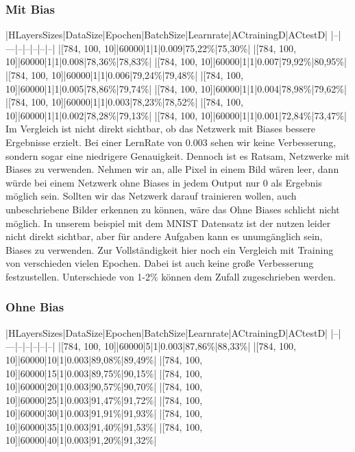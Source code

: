 \documentclass[12pt]{article}
\begin{document}
\subsubsection{ Mit Bias}|HLayersSizes|DataSize|Epochen|BatchSize|Learnrate|ACtrainingD|ACtestD|
|--|---|--|--|--|--|--|
|[784, 100, 10]|60000|1|1|0.009|75,22\%|75,30\%|
|[784, 100, 10]|60000|1|1|0.008|78,36\%|78,83\%|
|[784, 100, 10]|60000|1|1|0.007|79,92\%|80,95\%|
|[784, 100, 10]|60000|1|1|0.006|79,24\%|79,48\%|
|[784, 100, 10]|60000|1|1|0.005|78,86\%|79,74\%|
|[784, 100, 10]|60000|1|1|0.004|78,98\%|79,62\%|
|[784, 100, 10]|60000|1|1|0.003|78,23\%|78,52\%|
|[784, 100, 10]|60000|1|1|0.002|78,28\%|79,13\%|
|[784, 100, 10]|60000|1|1|0.001|72,84\%|73,47\%|
Im Vergleich ist nicht direkt sichtbar, ob das Netzwerk mit Biases bessere Ergebnisse erzielt. Bei einer LernRate von 0.003 sehen wir keine Verbesserung, sondern sogar eine niedrigere Genauigkeit.
Dennoch ist es Ratsam, Netzwerke mit Biases zu verwenden. Nehmen wir an, alle Pixel in einem Bild wären leer, dann würde bei einem Netzwerk ohne Biases in jedem Output nur 0 als Ergebnis möglich sein. Sollten wir das Netzwerk darauf trainieren wollen, auch unbeschriebene Bilder erkennen zu können, wäre das Ohne Biases schlicht nicht möglich. In unserem beispiel mit dem MNIST Datensatz ist der nutzen leider nicht direkt sichtbar, aber für andere Aufgaben kann es unumgänglich sein, Biases zu verwenden.
Zur Vollständigkeit hier noch ein Vergleich mit Training von verschieden vielen Epochen. Dabei ist auch keine große Verbesserung festzustellen. Unterschiede von 1-2\% können dem Zufall zugeschrieben werden.
\subsubsection{ Ohne Bias}|HLayersSizes|DataSize|Epochen|BatchSize|Learnrate|ACtrainingD|ACtestD|
|--|---|--|--|--|--|--|
|[784, 100, 10]|60000|5|1|0.003|87,86\%|88,33\%|
|[784, 100, 10]|60000|10|1|0.003|89,08\%|89,49\%|
|[784, 100, 10]|60000|15|1|0.003|89,75\%|90,15\%|
|[784, 100, 10]|60000|20|1|0.003|90,57\%|90,70\%|
|[784, 100, 10]|60000|25|1|0.003|91,47\%|91,72\%|
|[784, 100, 10]|60000|30|1|0.003|91,91\%|91,93\%|
|[784, 100, 10]|60000|35|1|0.003|91,40\%|91,53\%|
|[784, 100, 10]|60000|40|1|0.003|91,20\%|91,32\%|
\end{document}
